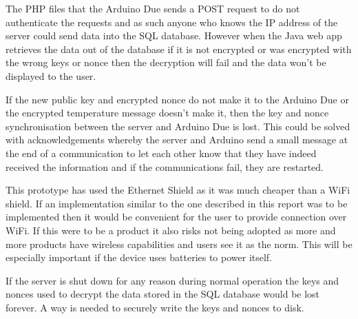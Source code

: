 The PHP files that the Arduino Due sends a POST request to do not authenticate the requests and as such anyone who knows the IP address of the server could send data into the SQL database. However when the Java web app retrieves the data out of the database if it is not encrypted or was encrypted with the wrong keys or nonce then the decryption will fail and the data won't be displayed to the user.

If the new public key and encrypted nonce do not make it to the Arduino Due or the encrypted temperature message doesn't make it, then the key and nonce synchronisation between the server and Arduino Due is lost. This could be solved with acknowledgements whereby the server and Arduino send a small message at the end of a communication to let each other know that they have indeed received the information and if the communications fail, they are restarted.

This prototype has used the Ethernet Shield as it was much cheaper than a WiFi shield. If an implementation similar to the one described in this report was to be implemented then it would be convenient for the user to provide connection over WiFi. If this were to be a product it also risks not being adopted as more and more products have wireless capabilities and users see it as the norm. This will be especially important if the device uses batteries to power itself.

If the server is shut down for any reason during normal operation the keys and nonces used to decrypt the data stored in the SQL database would be lost forever. A way is needed to securely write the keys and nonces to disk.